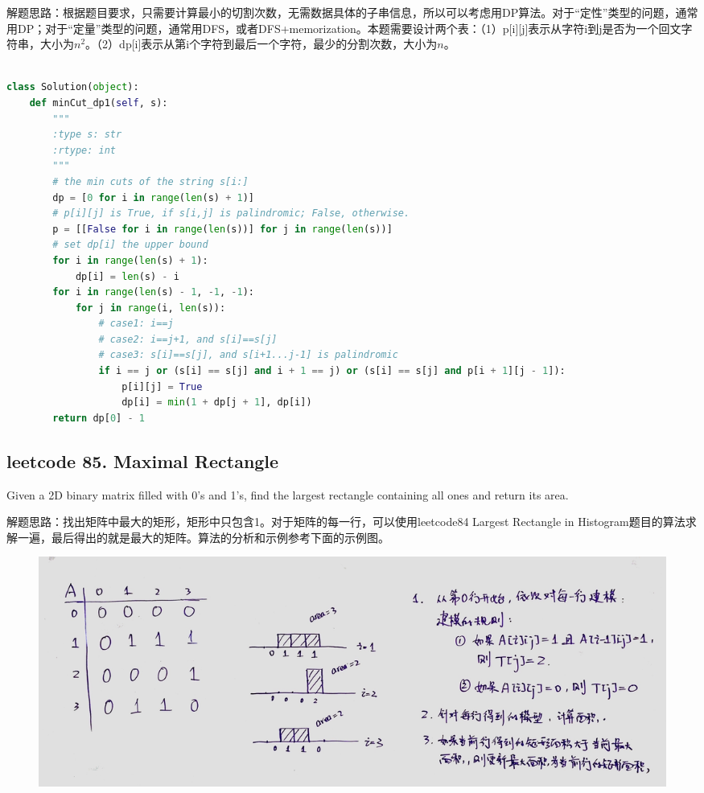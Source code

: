 \documentclass[a4paper,10pt]{article}
\begin{document}
\begin{CJK*}{UTF8}{gbsn}
\noindent 解题思路：根据题目要求，只需要计算最小的切割次数，无需数据具体的子串信息，所以可以考虑用DP算法。对于“定性”类型的问题，通常用DP；对于“定量”类型的问题，通常用DFS，或者DFS+memorization。本题需要设计两个表：（1）p[i][j]表示从字符i到j是否为一个回文字符串，大小为$n^2$。（2）dp[i]表示从第i个字符到最后一个字符，最少的分割次数，大小为$n$。\\
\end{CJK*}


\begin{lstlisting}[language=Python, caption=Problem132. Palindrome Partitioning II]

class Solution(object):
    def minCut_dp1(self, s):
        """
        :type s: str
        :rtype: int
        """
        # the min cuts of the string s[i:]
        dp = [0 for i in range(len(s) + 1)]
        # p[i][j] is True, if s[i,j] is palindromic; False, otherwise.
        p = [[False for i in range(len(s))] for j in range(len(s))]
        # set dp[i] the upper bound
        for i in range(len(s) + 1):
            dp[i] = len(s) - i
        for i in range(len(s) - 1, -1, -1):
            for j in range(i, len(s)):
                # case1: i==j
                # case2: i==j+1, and s[i]==s[j]
                # case3: s[i]==s[j], and s[i+1...j-1] is palindromic
                if i == j or (s[i] == s[j] and i + 1 == j) or (s[i] == s[j] and p[i + 1][j - 1]):
                    p[i][j] = True
                    dp[i] = min(1 + dp[j + 1], dp[i])
        return dp[0] - 1
\end{lstlisting}


\subsection{leetcode 85. Maximal Rectangle}
Given a 2D binary matrix filled with 0's and 1's, find the largest rectangle containing all ones and return its area. \\

\begin{CJK*}{UTF8}{gbsn}
\noindent 解题思路：找出矩阵中最大的矩形，矩形中只包含1。对于矩阵的每一行，可以使用leetcode84 Largest Rectangle in Histogram题目的算法求解一遍，最后得出的就是最大的矩阵。算法的分析和示例参考下面的示例图。
\end{CJK*}

\begin{figure}[h]
    \includegraphics[width=1\textwidth]{leetcode85.jpg}
    \centering\\
\end{figure}
\end{document}
